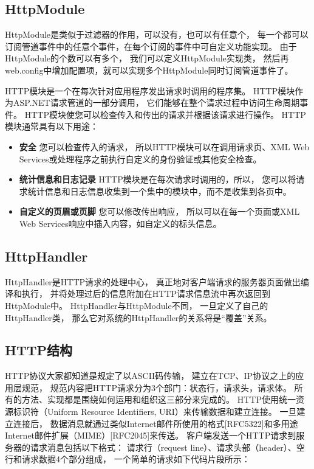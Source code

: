 \documentclass{book}
\begin{document}
\subsection{HttpModule}

HttpModule是类似于过滤器的作用，可以没有，也可以有任意个，
每一个都可以订阅管道事件中的任意个事件，在每个订阅的事件中可自定义功能实现。
由于HttpModule的个数可以有多个，
我们可以定义HttpModule实现类，
然后再web.config中增加配置项，就可以实现多个HttpModule同时订阅管道事件了。

HTTP模块是一个在每次针对应用程序发出请求时调用的程序集。
HTTP模块作为ASP.NET请求管道的一部分调用，
它们能够在整个请求过程中访问生命周期事件。
HTTP模块使您可以检查传入和传出的请求并根据该请求进行操作。
HTTP 模块通常具有以下用途：

\begin{itemize}
\item{\textbf{安全}}
您可以检查传入的请求，
所以HTTP模块可以在调用请求页、XML Web Services或处理程序之前执行自定义的身份验证或其他安全检查。
\item{\textbf{统计信息和日志记录}}
HTTP模块是在每次请求时调用的，所以，
您可以将请求统计信息和日志信息收集到一个集中的模块中，而不是收集到各页中。
\item{\textbf{自定义的页眉或页脚}}
您可以修改传出响应，
所以可以在每一个页面或XML Web Services响应中插入内容，如自定义的标头信息。
\end{itemize}

\subsection{HttpHandler}
 
HttpHandler是HTTP请求的处理中心，
真正地对客户端请求的服务器页面做出编译和执行，
并将处理过后的信息附加在HTTP请求信息流中再次返回到HttpModule中。  
HttpHandler与HttpModule不同，
一旦定义了自己的HttpHandler类，
那么它对系统的HttpHandler的关系将是“覆盖”关系。 
 
\subsection{HTTP结构}

HTTP协议大家都知道是规定了以ASCII码传输，
建立在TCP、IP协议之上的应用层规范，
规范内容把HTTP请求分为3个部门：状态行，请求头，请求体。
所有的方法、实现都是围绕如何运用和组织这三部分来完成的。
HTTP使用统一资源标识符（Uniform Resource Identifiers, URI）来传输数据和建立连接。
一旦建立连接后，
数据消息就通过类似Internet邮件所使用的格式[RFC5322]和多用途Internet邮件扩展（MIME）[RFC2045]来传送。
客户端发送一个HTTP请求到服务器的请求消息包括以下格式：
请求行（request line）、请求头部（header）、空行和请求数据4个部分组成，
一个简单的请求如下代码片段所示：
\end{document}
